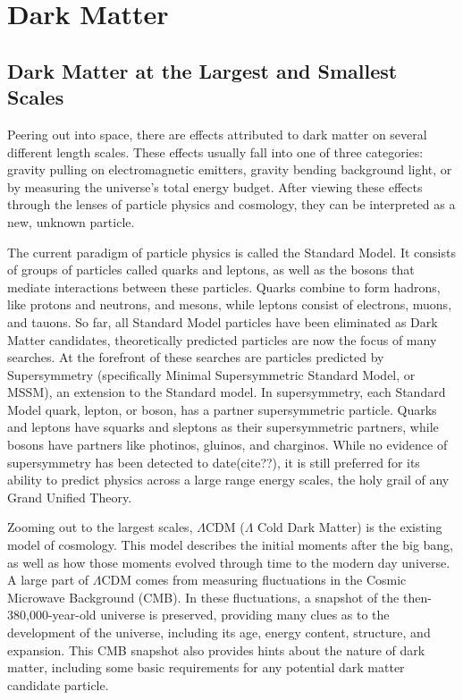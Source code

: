 \cleartooddpage[\thispagestyle{empty}]
\chapter{Dark Matter}

\section{Dark Matter at the Largest and Smallest Scales} %

Peering out into space, there are effects attributed to dark matter on several different length scales.
These effects usually fall into one of three categories: gravity pulling on electromagnetic emitters, gravity bending background light, or by measuring the universe's total energy budget.
After viewing these effects through the lenses of particle physics and cosmology, they can be interpreted as a new, unknown particle.

The current paradigm of particle physics is called the Standard Model.
It consists of groups of particles called quarks and leptons, as well as the bosons that mediate interactions between these particles.
Quarks combine to form hadrons, like protons and neutrons, and mesons, while leptons consist of electrons, muons, and tauons.
So far, all Standard Model particles have been eliminated as Dark Matter candidates, theoretically predicted particles are now the focus of many searches.
At the forefront of these searches are particles predicted by Supersymmetry (specifically Minimal Supersymmetric Standard Model, or MSSM), an extension to the Standard model.
In supersymmetry, each Standard Model quark, lepton, or boson, has a partner supersymmetric particle.
Quarks and leptons have squarks and sleptons as their supersymmetric partners, while bosons have partners like photinos, gluinos, and charginos.
While no evidence of supersymmetry has been detected to date(cite??), it is still preferred for its ability to predict physics across a large range energy scales, the holy grail of any Grand Unified Theory.

Zooming out to the largest scales, $\Lambda$CDM ($\Lambda$ Cold Dark Matter) is the existing model of cosmology.
This model describes the initial moments after the big bang, as well as how those moments evolved through time to the modern day universe.
A large part of $\Lambda$CDM comes from measuring fluctuations in the Cosmic Microwave Background (CMB).
In these fluctuations, a snapshot of the then-380,000-year-old universe is preserved, providing many clues as to the development of the universe, including its age, energy content, structure, and expansion. %
This CMB snapshot also provides hints about the nature of dark matter, including some basic requirements for any potential dark matter candidate particle.

